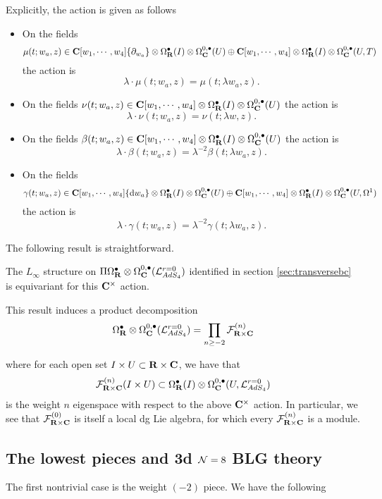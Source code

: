 \documentclass[../main.tex]{subfiles}
\begin{document}
Explicitly, the action is given as follows 
\begin{itemize}
\item On the fields 
\[
\mu(t; w_a,z) \in \mathbf{C}[w_1, \cdots, w_4]\{\partial_{w_a}\} \otimes \Omega^\bullet_{\mathbf{R}}(I) \otimes \Omega^{0,\bullet}_{\mathbf{C}} (U) \oplus \mathbf{C}[w_1, \cdots, w_4]\otimes \Omega^\bullet_{\mathbf{R}}(I)\otimes \Omega^{0,\bullet}_{\mathbf{C}}(U, T)\] 
the action is
\[
\lambda \cdot \mu(t; w_a,z) = \mu(t; \lambda w_a , z).
\]
\item On the fields $\nu(t; w_a,z) \in \mathbf{C}[w_1, \cdots, w_4] \otimes \Omega^{\bullet}_{\mathbf{R}}(I) \otimes \Omega^{0,\bullet}_{\mathbf{C}}(U)$ the action is
\[
\lambda \cdot \nu(t; w_a,z) = \nu(t; \lambda w , z).
\]
\item On the fields $\beta(t; w_a,z) \in  \mathbf{C}[w_1, \cdots, w_4] \otimes \Omega^{\bullet}_{\mathbf{R}}(I) \otimes \Omega^{0,\bullet}_{\mathbf{C}}(U)$ the action is
\[
\lambda \cdot \beta(t; w_a,z) = \lambda^{-2} \beta(t; \lambda w_a , z).
\]
\item On the fields 
\[
\gamma(t; w_a,z) \in  \mathbf{C}[w_1, \cdots, w_4] \{\mathrm{d} w_a\} \otimes \Omega^{\bullet}_{\mathbf{R}}(I) \otimes\Omega^{0,\bullet}_{\mathbf{C}} (U) \oplus  \mathbf{C}[w_1, \cdots, w_4] \otimes \Omega^{\bullet}_{\mathbf{R}}(I) \otimes\Omega^{0,\bullet}_{\mathbf{C}}(U, \Omega^1)
\] 
the action is
\[
\lambda \cdot \gamma(t; w_a,z) = \lambda^{-2} \gamma(t; \lambda w _a, z).
\]
\end{itemize}

The following result is straightforward.

\begin{prop}\label{prop:ads4decomp}
The $L_\infty$ structure on $\Pi\Omega^\bullet_{\mathbf{R}}\otimes \Omega^{0,\bullet}_{\mathbf{C}} (\mathcal{L}^{r=0}_{AdS_4} )$ identified in section \ref{sec:transversebc} is equivariant for this $\mathbf{C}^\times$ action.
\end{prop}

This result induces a product decomposition 
\[
\Omega^\bullet_{\mathbf{R}}\otimes \Omega^{0,\bullet}_{\mathbf{C}} (\mathcal{L}^{r=0}_{AdS_4} ) = \prod _{n\geq -2} \mathcal{F}^{(n)}_{\mathbf{R}\times \mathbf{C}}
\]

where for each open set $I\times U\subset\mathbf{R}\times \mathbf{C}$, we have that \[\mathcal{F}_{\mathbf{R}\times \mathbf{C}}^{(n)} (I\times U) \subset \Omega^\bullet_{\mathbf{R}} (I) \otimes \Omega^{0,\bullet}_{\mathbf{C}} (U, \mathcal{L}^{r=0}_{AdS_4} )\] is the weight $n$ eigenspace with respect to the above $\mathbf{C}^\times$ action. In particular, we see that $\mathcal{F}^{(0)}_{\mathbf{R}\times \mathbf{C}}$ is itself a local dg Lie algebra, for which  every $\mathcal{F}^{(n)}_{\mathbf{R}\times \mathbf{C}}$ is a module.

\subsection{The lowest pieces and 3d $\mathcal{N}=8$ BLG theory}\label{sec:BLG}
\parsec[] The first nontrivial case is the weight ${(-2)}$ piece. We have the following
\end{document}
